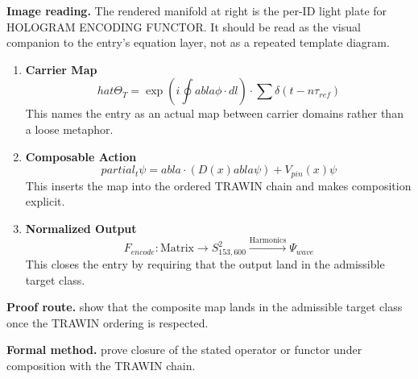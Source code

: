 \begin{samepage}
\noindent\begin{minipage}[t]{0.45\linewidth}
\vspace{0pt}
\raggedright
\scriptsize\textbf{Image reading.} The rendered manifold at right is the per-ID light plate for HOLOGRAM ENCODING FUNCTOR. It should be read as the visual companion to the entry's equation layer, not as a repeated template diagram.\par
\end{minipage}\hfill
\begin{minipage}[t]{0.53\linewidth}
\vspace*{-0.10in}
\raggedright
{}
\end{minipage}
\end{samepage}

\clearpage


\begin{enumerate}[leftmargin=1.6em,itemsep=9pt,topsep=6pt]
\item \textbf{Carrier Map}
\[
hat{\Theta}_T = \exp\left( i \oint  abla \phi \cdot dl \right) \cdot \sum \delta(t - n\tau_{ref})
\]
This names the entry as an actual map between carrier domains rather than a loose metaphor.

\item \textbf{Composable Action}
\[
partial_t \psi =  abla \cdot (D(x)  abla \psi) + V_{pin}(x) \psi
\]
This inserts the map into the ordered TRAWIN chain and makes composition explicit.

\item \textbf{Normalized Output}
\[
F_{encode}: \text{Matrix} \to S^2_{153,600} \xrightarrow{\text{Harmonics}} \Psi_{wave}
\]
This closes the entry by requiring that the output land in the admissible target class.
\end{enumerate}

\textbf{Proof route.} show that the composite map lands in the admissible target class once the TRAWIN ordering is respected.

\textbf{Formal method.} prove closure of the stated operator or functor under composition with the TRAWIN chain.

\medskip
{}

